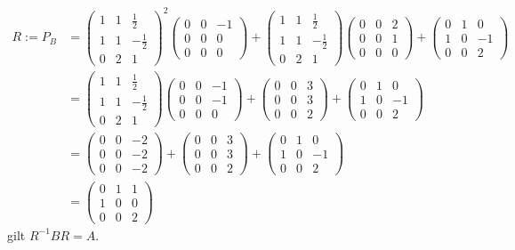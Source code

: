 \documentclass[../../main.tex]{subfiles}
\begin{document}
\begin{bsp}
\begin{align*}
        R:=P_B&=\begin{pmatrix}1&1&\frac{1}{2}\\1&1&-\frac{1}{2}\\0&2&1\end{pmatrix}^2\begin{pmatrix}0&0&-1\\0&0&0\\0&0&0\end{pmatrix}+\begin{pmatrix}1&1&\frac{1}{2}\\1&1&-\frac{1}{2}\\0&2&1\end{pmatrix}\begin{pmatrix}0&0&2\\0&0&1\\0&0&0\end{pmatrix}+\begin{pmatrix}0&1&0\\1&0&-1\\0&0&2\end{pmatrix}\\
        &=\begin{pmatrix}1&1&\frac{1}{2}\\1&1&-\frac{1}{2}\\0&2&1\end{pmatrix}\begin{pmatrix}0&0&-1\\0&0&-1\\0&0&0\end{pmatrix}+\begin{pmatrix}0&0&3\\0&0&3\\0&0&2\end{pmatrix}+\begin{pmatrix}0&1&0\\1&0&-1\\0&0&2\end{pmatrix}\\
        &=\begin{pmatrix}0&0&-2\\0&0&-2\\0&0&-2\end{pmatrix}+\begin{pmatrix}0&0&3\\0&0&3\\0&0&2\end{pmatrix}+\begin{pmatrix}0&1&0\\1&0&-1\\0&0&2\end{pmatrix}\\
        &=\begin{pmatrix}0&1&1\\1&0&0\\0&0&2\end{pmatrix}
    \end{align*}
    gilt $R^{-1}BR=A$.
\end{bsp}
\end{document}
